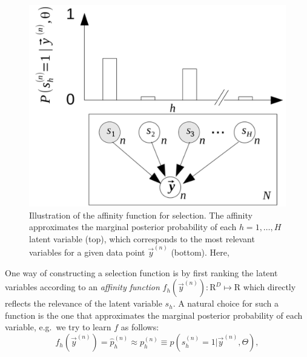\begin{figure}[h]
\begin{center}
\includegraphics[width=.535\textwidth]{graph-affinity2.pdf}
\caption{Illustration of the affinity function for selection.
The affinity approximates the marginal posterior probability of each $h=1,\dots,H$ latent variable (top), 
which corresponds to the most relevant variables for a given data point $\vec{y}^{(n)}$ (bottom). 
Here,  
}\label{fig:graph-affinity}
\end{center}
\end{figure}
%
One way of constructing a selection function %
is by first ranking the latent variables according to an 
\emph{affinity function} $f_h(\vec{y}^{(n)}) : \mathrm{R}^D \mapsto \mathrm{R}$ %
which directly reflects the relevance of the latent variable $s_h$. 
%
A natural choice for such a function is the one that approximates the marginal posterior probability 
of each variable, e.g.\ we try to learn $f$ as follows:
%
\begin{equation}
\label{eq:affinity}
f_h(\vec{y}^{(n)}) = \hat{p}_h^{(n)} \approx p^{(n)}_h \equiv p(s^{(n)}_h = 1|\vec{y}^{(n)}, \Theta),
\end{equation}
%
